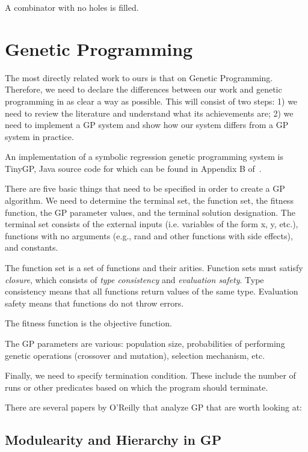 \documentclass{article}
\begin{document}
A combinator with no holes is filled.


\section{Genetic Programming}

The most directly related work to ours is that on Genetic Programming.
Therefore, we need to declare the differences between our work and genetic
programming in as clear a way as possible. This will consist of two steps: 1)
we need to review the literature and understand what its achievements are; 2)
we need to implement a GP system and show how our system differs from a GP
system in practice. 

An implementation of a symbolic regression genetic programming system is
TinyGP, Java source code for which can be found in Appendix B
of~\cite{poli08:fieldguide}. 

There are five basic things that need to be specified in order to create a GP
algorithm. We need to determine the terminal set, the function set, the fitness
function, the GP parameter values, and the terminal solution designation. The
terminal set consists of the external inputs (i.e.  variables of the form x, y,
etc.), functions with no arguments (e.g., rand and other functions with side
effects), and constants. 

The function set is a set of functions and their arities. Function sets must
satisfy \emph{closure}, which consists of \emph{type consistency} and
\emph{evaluation safety}. Type consistency means that all functions return
values of the same type. Evaluation safety means that functions do not throw
errors. 

The fitness function is the objective function. 

The GP parameters are various: population size, probabilities of performing
genetic operations (crossover and mutation), selection mechanism, etc. 

Finally, we need to specify termination condition. These include the number of
runs or other predicates based on which the program should terminate.

There are several papers by O'Reilly that analyze GP that are worth looking at:
\cite{OReilly:thesis} \cite{OReilly:1995:tabbGP}

\subsection{Modulearity and Hierarchy in GP} 
\end{document}
